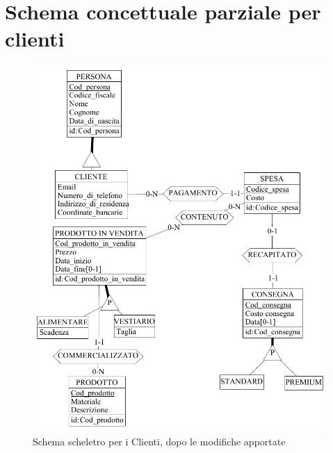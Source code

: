 \documentclass[a4paper,12pt]{report}
\begin{document}
\section{Schema concettuale parziale per clienti}
\begin{figure}[h]
	\centering{}
	\includegraphics[width=\textwidth]{img/SchemaConcettuale-Clienti2.pdf}
	\caption{Schema scheletro per i Clienti, dopo le modifiche apportate}
\end{figure}
\end{document}
